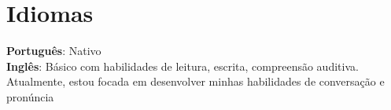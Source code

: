\documentclass[letterpaper,11pt]{article}
\begin{document}
\section{Idiomas}
 \begin{itemize}[leftmargin=0.15in, label={}]
    \small{\item{
     \textbf{Português}{: Nativo} \\
    \textbf{Inglês}{: Básico com habilidades de leitura, escrita, compreensão auditiva. Atualmente, estou focada em desenvolver minhas habilidades de conversação e pronúncia } \\

    }}
 \end{itemize}

%
\end{document}
